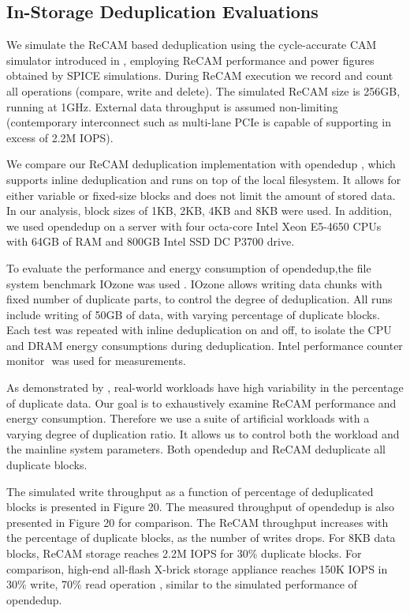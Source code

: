 \documentclass{superfri}
\begin{document}
\subsection{In-Storage Deduplication Evaluations}

We simulate the ReCAM based deduplication using the cycle-accurate CAM simulator introduced in \cite{yavits2015resistive}, employing ReCAM performance and power figures obtained by SPICE simulations. During ReCAM execution we record and count all operations (compare, write and delete).  The simulated ReCAM size is 256GB, running at 1GHz. External data throughput is assumed non-limiting (contemporary interconnect such as multi-lane PCIe is capable of supporting in excess of 2.2M IOPS).

We compare our ReCAM deduplication implementation with opendedup ‎\cite{silverberg2010opendedup}, which supports inline deduplication and runs on top of the local filesystem. It allows for either variable or fixed-size blocks and does not limit the amount of stored data. In our analysis, block sizes of 1KB, 2KB, 4KB and 8KB were used. In addition, we used opendedup on a server with four octa-core Intel Xeon E5-4650 CPUs with 64GB of RAM and 800GB Intel SSD DC P3700 drive.

To evaluate the performance and energy consumption of opendedup,the file system benchmark IOzone was used \cite{norcott2003iozone}. IOzone allows writing data chunks with fixed number of duplicate parts, to control the degree of deduplication. All runs include writing of 50GB of data, with varying percentage of duplicate blocks. Each test was repeated with inline deduplication on and off, to isolate the CPU and DRAM energy consumptions during deduplication. Intel performance counter monitor ‎\cite{intelPCM} was used for measurements. 

As demonstrated by ‎\cite{zhu2008avoiding}, real-world workloads have high variability in the percentage of duplicate data. Our goal is to exhaustively examine ReCAM performance and energy consumption. Therefore we use a suite of artificial workloads with a varying degree of duplication ratio. It allows us to control both the workload and the mainline system parameters. Both opendedup and ReCAM deduplicate all duplicate blocks.

The simulated write throughput as a function of percentage of deduplicated blocks is presented in Figure 20. The measured throughput of opendedup is also presented in Figure 20 for comparison. The ReCAM throughput increases with the percentage of duplicate blocks, as the number of writes drops. For 8KB data blocks, ReCAM storage reaches 2.2M IOPS for 30\% duplicate blocks. For comparison, high-end all-flash X-brick storage appliance reaches 150K IOPS in 30\% write, 70\% read operation ‎\cite{XbrickSpec}, similar to the simulated performance of opendedup. 
\end{document}
